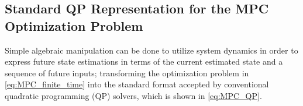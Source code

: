

\subsection{Standard QP Representation for the MPC Optimization Problem} \label{app:QP}
Simple algebraic manipulation can be done to utilize system dynamics in order to express future state estimations in terms of the current estimated state and a sequence of future inputs; transforming the optimization problem in \eqref{eq:MPC_finite_time} into the standard format accepted by conventional quadratic programming (QP) solvers, which is shown in \eqref{eq:MPC_QP}.


